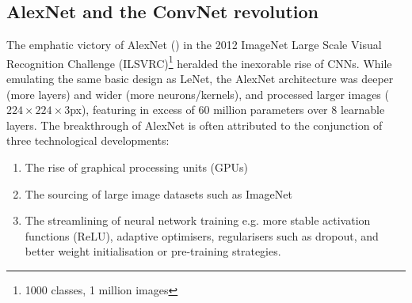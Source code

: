 
\subsection{AlexNet and the ConvNet revolution}

The emphatic victory of AlexNet (\cite{krizhevsky2012imagenet}) in the 2012 ImageNet Large Scale Visual Recognition Challenge (ILSVRC)\footnote{1000 classes, 1 million images} heralded the inexorable rise of CNNs. While emulating the same basic design as LeNet, the AlexNet architecture was deeper (more layers) and wider (more neurons/kernels), and processed larger images ($224\times224\times3$px), featuring in excess of $60$ million parameters over 8 learnable layers. The breakthrough of AlexNet is often attributed to the conjunction of three technological developments:

\begin{enumerate}
\item The rise of graphical processing units (GPUs)
\item The sourcing of large image datasets such as ImageNet
\item The streamlining of neural network training e.g. more stable activation functions (ReLU), adaptive optimisers, regularisers such as dropout, and better weight initialisation or pre-training strategies.
\end{enumerate}

